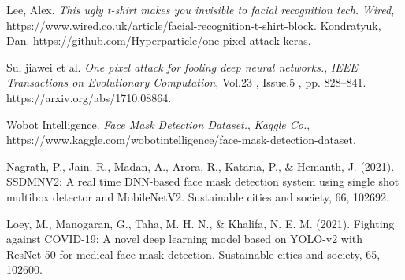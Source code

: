 \documentclass{article}
\begin{document}
\begin{thebibliography}{9}
Lee, Alex. \textit{This ugly t-shirt makes you invisible to facial recognition tech.} {\em Wired}, https://www.wired.co.uk/article/facial-recognition-t-shirt-block. 
    Kondratyuk, Dan. https://github.com/Hyperparticle/one-pixel-attack-keras.

    Su, jiawei et al.  \textit{One pixel attack for fooling deep neural networks.}, {\em IEEE Transactions on Evolutionary Computation}, Vol.23 , Issue.5 , pp. 828--841. https://arxiv.org/abs/1710.08864.
    
    Wobot Intelligence. \textit{Face Mask Detection Dataset.}, {\em Kaggle Co.}, https://www.kaggle.com/wobotintelligence/face-mask-detection-dataset.
    
    Nagrath, P., Jain, R., Madan, A., Arora, R., Kataria, P., \& Hemanth, J. (2021). SSDMNV2: A real time DNN-based face mask detection system using single shot multibox detector and MobileNetV2. Sustainable cities and society, 66, 102692.

    Loey, M., Manogaran, G., Taha, M. H. N., \& Khalifa, N. E. M. (2021). Fighting against COVID-19: A novel deep learning model based on YOLO-v2 with ResNet-50 for medical face mask detection. Sustainable cities and society, 65, 102600.


\end{thebibliography}
\end{document}
